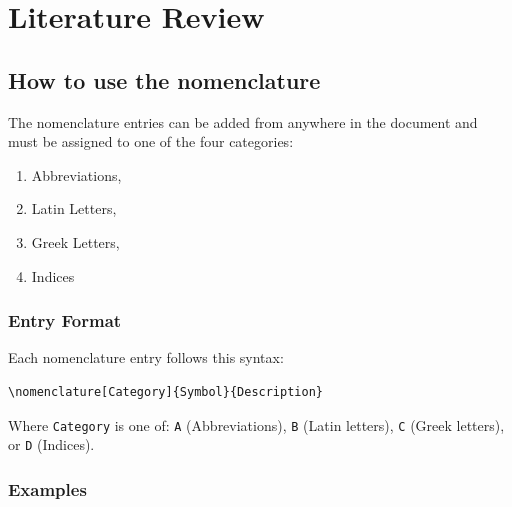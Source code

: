 \chapter{Literature Review}

\section{How to use the nomenclature}

The nomenclature entries can be added from anywhere in the document and must be assigned to one of the four categories:
\begin{enumerate}[label=\emph{\Alph*}]
    \item Abbreviations,
    \item Latin Letters,
    \item Greek Letters,
    \item Indices
\end{enumerate}

\subsection*{Entry Format}
Each nomenclature entry follows this syntax:
\begin{verbatim}
\nomenclature[Category]{Symbol}{Description}
\end{verbatim}

Where \texttt{Category} is one of: \texttt{A} (Abbreviations), \texttt{B} (Latin letters), \texttt{C} (Greek letters), or \texttt{D} (Indices).

\subsection*{Examples}

